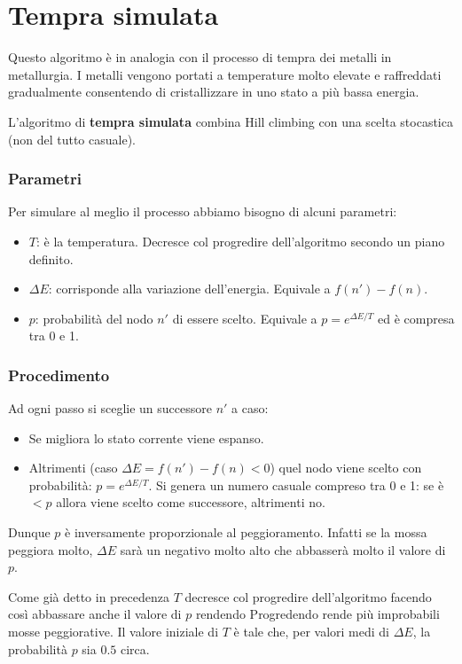 \section{Tempra simulata}
Questo algoritmo \`e in analogia con il processo di tempra dei metalli in metallurgia. I metalli vengono
portati a temperature molto elevate e raffreddati gradualmente consentendo di cristallizzare in uno stato
a pi\`u bassa energia.

L'algoritmo di \textbf{tempra simulata} combina Hill climbing con una scelta stocastica (non del tutto
casuale).
\subsubsection{Parametri}
Per simulare al meglio il processo abbiamo bisogno di alcuni parametri:
\begin{itemize}
	\item $T$: \`e la temperatura. Decresce col progredire dell'algoritmo secondo un piano definito.
	\item $\Delta E$: corrisponde alla variazione dell'energia. Equivale a $f(n') - f(n)$.
	\item $p$: probabilit\`a del nodo $n'$ di essere scelto. Equivale a $p = e^{\Delta E / T}$ ed \`e
	      compresa tra 0 e 1.
\end{itemize}

\subsubsection{Procedimento}
Ad ogni passo si sceglie un successore $n'$ a caso:
\begin{itemize}
	\item Se migliora lo stato corrente viene espanso.
	\item Altrimenti (caso $\Delta E = f(n') - f(n) < 0$) quel nodo viene scelto con probabilit\`a: $p = e^{\Delta E / T}$.
	      Si genera un numero casuale compreso tra 0 e 1: se \`e $< p$ allora viene scelto come successore, altrimenti no.
\end{itemize}
Dunque $p$ \`e inversamente proporzionale al peggioramento. Infatti se la mossa peggiora molto, $\Delta E$ sar\`a un negativo
molto alto che abbasser\`a molto il valore di $p$.

Come gi\`a detto in precedenza $T$ decresce col progredire dell'algoritmo facendo cos\`i abbassare anche il valore di $p$ rendendo
Progredendo rende pi\`u improbabili mosse peggiorative. Il valore iniziale di $T$ \`e tale che, per valori medi di $\Delta E$, la
probabilit\`a $p$ sia $0.5$ circa.

